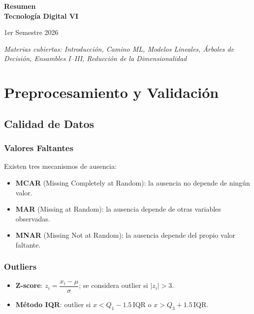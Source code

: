 \documentclass[12pt, a4paper]{article}
\begin{document}
\begin{titlepage}
	\centering
	\vspace*{2cm}
	{\Huge\bfseries\color{azul} Resumen \\[0.4em]
		Tecnología Digital VI\par}
	\vspace{0.5cm}
	{\large 1er Semestre 2026\par}
	\vspace{3cm}
	{\large\itshape Materias cubiertas: Introducción, Camino ML, Modelos Lineales,
		Árboles de Decisión, Ensambles I–III, Reducción de la Dimensionalidad\par}
\end{titlepage}

\tableofcontents
\newpage

\section{Preprocesamiento y Validación}

\subsection{Calidad de Datos}

\subsubsection{Valores Faltantes}
Existen tres mecanismos de ausencia:
\begin{itemize}
	\item \textbf{MCAR} (Missing Completely at Random): la ausencia no depende de ningún valor.
	\item \textbf{MAR} (Missing at Random): la ausencia depende de otras variables observadas.
	\item \textbf{MNAR} (Missing Not at Random): la ausencia depende del propio valor faltante.
\end{itemize}

\subsubsection{Outliers}
\begin{itemize}
	\item \textbf{Z-score}: $z_i = \dfrac{x_i - \mu}{\sigma}$; se considera outlier si $|z_i| > 3$.
	\item \textbf{Método IQR}: outlier si $x < Q_1 - 1.5\,\text{IQR}$ o $x > Q_3 + 1.5\,\text{IQR}$.
\end{itemize}
\end{document}
